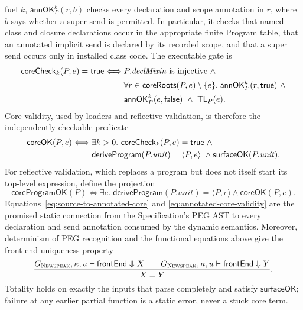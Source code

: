 fuel $k$, $\mathsf{annOK}^{k}_{P}(r,b)$ checks every declaration and scope
annotation in $r$, where $b$ says whether a super send is permitted.  In
particular, it checks that named class and closure declarations occur in the
appropriate finite Program table, that an annotated implicit send is declared
by its recorded scope, and that a super send occurs only in installed class
code.  The executable gate is
\begin{equation}\label{eq:annotated-core-checker}
\begin{split}
 \mathsf{coreCheck}_{k}(P,e)=\mathsf{true}\Longleftrightarrow{}&
 P.\mathit{declMixin}\text{ is injective}\ \land\\
 &\forall r\in\mathsf{coreRoots}(P,e)\setminus\{e\}.\;
       \mathsf{annOK}^{k}_{P}(r,\mathsf{true})\ \land\\
 &\mathsf{annOK}^{k}_{P}(e,\mathsf{false})\ \land\ \mathsf{TL}_{P}(e).
\end{split}
\end{equation}
Core validity, used by loaders and reflective validation, is therefore the
independently checkable predicate
\begin{equation}\label{eq:annotated-core-validity}
\begin{split}
 \mathsf{coreOK}(P,e)\Longleftrightarrow{}&
 \exists k>0.\ \mathsf{coreCheck}_{k}(P,e)=\mathsf{true}\ \land\\
 &\mathsf{deriveProgram}(P.\mathit{unit})=\langle P,e\rangle\ \land
   \mathsf{surfaceOK}(P.\mathit{unit}).
\end{split}
\end{equation}
For reflective validation, which replaces a program but does not itself start
its top-level expression, define the projection
\begin{equation}\label{eq:annotated-program-validity}
 \mathsf{coreProgramOK}(P)
 \Longleftrightarrow
 \exists e.\;\mathsf{deriveProgram}(P.\mathit{unit})=\langle P,e\rangle
              \land\mathsf{coreOK}(P,e).
\end{equation}
Equations~\eqref{eq:source-to-annotated-core} and
\eqref{eq:annotated-core-validity} are the promised static connection from the
Specification's PEG AST to every declaration and send annotation consumed by
the dynamic semantics.  Moreover, determinism of PEG recognition and the
functional equations above give the front-end uniqueness property
\begin{equation}\label{eq:front-end-uniqueness}
 \frac{G_{\textsc{Newspeak}},\kappa,u\vdash\mathsf{frontEnd}\Downarrow X\qquad
       G_{\textsc{Newspeak}},\kappa,u\vdash\mathsf{frontEnd}\Downarrow Y}{X=Y}.
\end{equation}
Totality holds on exactly the inputs that parse completely and satisfy
$\mathsf{surfaceOK}$; failure at any earlier partial function is a static
error, never a stuck core term.

